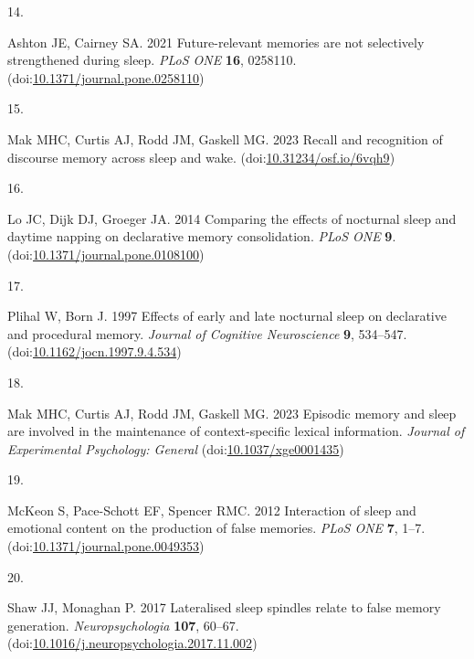 \documentclass[
]{article}
\newlength{\cslhangindent}
\newlength{\csllabelwidth}
\newlength{\cslentryspacingunit} %
\newenvironment{CSLReferences}[2] %
 {%
  \setlength{\parindent}{0pt}
  \ifodd #1
  \let\oldpar\par
  \def\par{\hangindent=\cslhangindent\oldpar}
  \fi
  \setlength{\parskip}{#2\cslentryspacingunit}
 }%
 {}
\newcommand{\CSLLeftMargin}[1]{\parbox[t]{\csllabelwidth}{#1}}
\newcommand{\CSLRightInline}[1]{\parbox[t]{\linewidth - \csllabelwidth}{#1}\break}
\begin{document}
\begin{CSLReferences}{0}{0}
\leavevmode{}%
\CSLLeftMargin{14. }%
\CSLRightInline{Ashton JE, Cairney SA. 2021 Future-relevant memories are not selectively strengthened during sleep. \emph{PLoS ONE} \textbf{16}, 0258110. (doi:\href{https://doi.org/10.1371/journal.pone.0258110}{10.1371/journal.pone.0258110})}

\leavevmode{}%
\CSLLeftMargin{15. }%
\CSLRightInline{Mak MHC, Curtis AJ, Rodd JM, Gaskell MG. 2023 Recall and recognition of discourse memory across sleep and wake. (doi:\href{https://doi.org/10.31234/osf.io/6vqh9}{10.31234/osf.io/6vqh9})}

\leavevmode{}%
\CSLLeftMargin{16. }%
\CSLRightInline{Lo JC, Dijk DJ, Groeger JA. 2014 Comparing the effects of nocturnal sleep and daytime napping on declarative memory consolidation. \emph{PLoS ONE} \textbf{9}. (doi:\href{https://doi.org/10.1371/journal.pone.0108100}{10.1371/journal.pone.0108100})}

\leavevmode{}%
\CSLLeftMargin{17. }%
\CSLRightInline{Plihal W, Born J. 1997 Effects of early and late nocturnal sleep on declarative and procedural memory. \emph{Journal of Cognitive Neuroscience} \textbf{9}, 534--547. (doi:\href{https://doi.org/10.1162/jocn.1997.9.4.534}{10.1162/jocn.1997.9.4.534})}

\leavevmode{}%
\CSLLeftMargin{18. }%
\CSLRightInline{Mak MHC, Curtis AJ, Rodd JM, Gaskell MG. 2023 Episodic memory and sleep are involved in the maintenance of context-specific lexical information. \emph{Journal of Experimental Psychology: General} (doi:\href{https://doi.org/10.1037/xge0001435}{10.1037/xge0001435})}

\leavevmode{}%
\CSLLeftMargin{19. }%
\CSLRightInline{McKeon S, Pace-Schott EF, Spencer RMC. 2012 Interaction of sleep and emotional content on the production of false memories. \emph{PLoS ONE} \textbf{7}, 1--7. (doi:\href{https://doi.org/10.1371/journal.pone.0049353}{10.1371/journal.pone.0049353})}

\leavevmode{}%
\CSLLeftMargin{20. }%
\CSLRightInline{Shaw JJ, Monaghan P. 2017 Lateralised sleep spindles relate to false memory generation. \emph{Neuropsychologia} \textbf{107}, 60--67. (doi:\href{https://doi.org/10.1016/j.neuropsychologia.2017.11.002}{10.1016/j.neuropsychologia.2017.11.002})}


\end{CSLReferences}
\end{document}
